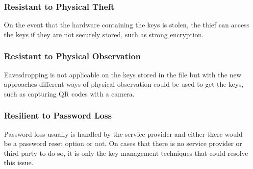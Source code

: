 \subsubsection{Resistant to Physical Theft}
\label{Resistant to Physical Theft}
On the event that the hardware containing the keys is stolen, the thief can access the keys if they are not securely stored, such as strong encryption.

\subsubsection{Resistant to Physical Observation}
\label{Resistant to Physical Observation}
Eavesdropping is not applicable on the keys stored in the file but with the new approaches different ways of physical observation could be used to get the keys, such as capturing QR codes with a camera.

\subsubsection{Resilient to Password Loss}
\label{Resilient to Password Loss}
Password loss usually is handled by the service provider and either there would be a password reset option or not. On cases that there is no service provider or third party to do so, it is only the key management techniques that could resolve this issue.



